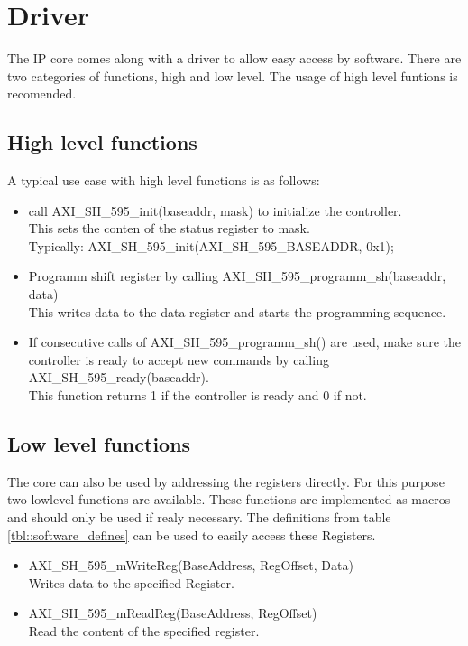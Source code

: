 \section{Driver}
\label{sec::driver}

The IP core comes along with a driver to allow easy access by software.
There are two categories of functions, high and low level.
The usage of high level funtions is recomended.

\subsection{High level functions}
A typical use case with high level functions is as follows:
\begin{itemize}
	\item call AXI\_SH\_595\_init(baseaddr, mask) to initialize the controller. \\
		This sets the conten of the status register to mask. \\
		Typically: AXI\_SH\_595\_init(AXI\_SH\_595\_BASEADDR, 0x1);
	\item Programm shift register by calling AXI\_SH\_595\_programm\_sh(baseaddr, data) \\
		This writes data to the data register and starts the programming sequence.
	\item If consecutive calls of AXI\_SH\_595\_programm\_sh() are used, make sure the controller is ready to accept new commands by calling AXI\_SH\_595\_ready(baseaddr). \\
	This function returns 1 if the controller is ready and 0 if not.
\end{itemize}

\subsection{Low level functions}
The core can also be used by addressing the registers directly.
For this purpose two lowlevel functions are available.
These functions are implemented as macros and should only be used if realy necessary.
The definitions from table \ref{tbl::software_defines} can be used to easily access these Registers.

\begin{itemize}
	\item AXI\_SH\_595\_mWriteReg(BaseAddress, RegOffset, Data) \\
		Writes data to the specified Register. 
	\item AXI\_SH\_595\_mReadReg(BaseAddress, RegOffset) \\		
		Read the content of the specified register.
\end{itemize}

